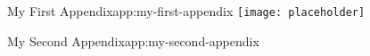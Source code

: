 \begin{appframe}[t]{My First Appendix}{app:my-first-appendix}
\centering
\texttt{[image: placeholder]}
\end{appframe}

\begin{appframe}[t]{My Second Appendix}{app:my-second-appendix}

\end{appframe}
